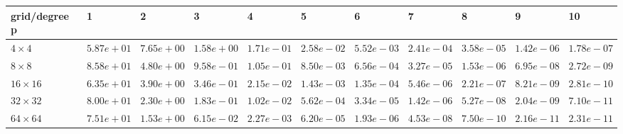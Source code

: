 \begin{tabular}{lllllllllll}
\hline
 grid/degree p   & 1          & 2          & 3          & 4          & 5          & 6          & 7          & 8          & 9          & 10         \\
\hline
 $4 \times 4$    & $5.87e+01$ & $7.65e+00$ & $1.58e+00$ & $1.71e-01$ & $2.58e-02$ & $5.52e-03$ & $2.41e-04$ & $3.58e-05$ & $1.42e-06$ & $1.78e-07$ \\
 $8 \times 8$    & $8.58e+01$ & $4.80e+00$ & $9.58e-01$ & $1.05e-01$ & $8.50e-03$ & $6.56e-04$ & $3.27e-05$ & $1.53e-06$ & $6.95e-08$ & $2.72e-09$ \\
 $16 \times 16$  & $6.35e+01$ & $3.90e+00$ & $3.46e-01$ & $2.15e-02$ & $1.43e-03$ & $1.35e-04$ & $5.46e-06$ & $2.21e-07$ & $8.21e-09$ & $2.81e-10$ \\
 $32 \times 32$  & $8.00e+01$ & $2.30e+00$ & $1.83e-01$ & $1.02e-02$ & $5.62e-04$ & $3.34e-05$ & $1.42e-06$ & $5.27e-08$ & $2.04e-09$ & $7.10e-11$ \\
 $64 \times 64$  & $7.51e+01$ & $1.53e+00$ & $6.15e-02$ & $2.27e-03$ & $6.20e-05$ & $1.93e-06$ & $4.53e-08$ & $7.50e-10$ & $2.16e-11$ & $2.31e-11$ \\
\hline
\end{tabular}